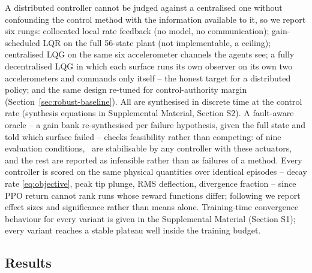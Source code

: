 \documentclass[journal]{new-aiaa}
\begin{document}
A distributed controller cannot be judged against a centralised one
without confounding the control method with the information available to
it, so we report six rungs: collocated local rate feedback (no model, no
communication); gain-scheduled LQR on the full 56-state plant (not
implementable, a ceiling); centralised LQG on the same six accelerometer
channels the agents see; a fully decentralised LQG in which each surface
runs its own observer on its own two accelerometers and commands only
itself \cite{siljak1991decentralized,anderson2007optimal} -- the honest
target for a distributed policy; and the same design re-tuned for
control-authority margin (Section~\ref{sec:robust-baseline}). All are
synthesised in discrete time at the control rate (synthesis equations in
Supplemental Material, Section S2). A fault-aware oracle -- a gain bank
re-synthesised per failure hypothesis, given the full state and told which
surface failed -- checks feasibility rather than competing: of nine
evaluation conditions, \FeasibleCells\ are stabilisable by any controller
with these actuators, and the rest are reported as infeasible rather than
as failures of a method. Every controller is scored on the same physical
quantities over identical episodes -- decay rate \eqref{eq:objective}, peak
tip plunge, RMS deflection, divergence fraction -- since PPO return cannot
rank runs whose reward functions differ; following
\cite{agarwal2021precipice} we report effect sizes and significance rather
than means alone. Training-time convergence behaviour for every variant is
given in the Supplemental Material (Section S1); every variant reaches a
stable plateau well inside the training budget.

\subsection{Results}
\label{sec:results}

\begin{table}[t]
\centering
\caption{Energy decay rate by controller and flight condition. Negative is
suppressed, \texttt{D} marks the fraction of episodes that diverged, and
\texttt{--} marks conditions infeasible for any controller.}
\label{tab:main}
\footnotesize

\end{table}
\end{document}
